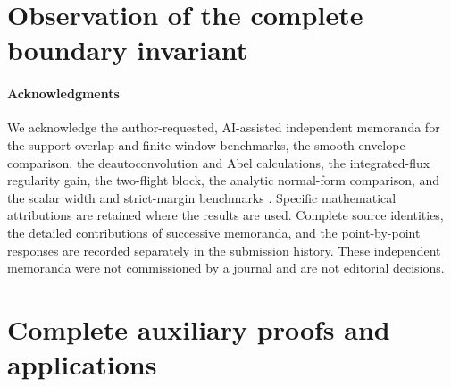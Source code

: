 \part{Observation of the complete boundary invariant}



\subsection*{Acknowledgments}
We acknowledge the author-requested, AI-assisted independent memoranda
for the support-overlap and finite-window benchmarks, the smooth-envelope
comparison, the deautoconvolution and Abel calculations, the integrated-flux
regularity gain, the two-flight block, the analytic normal-form comparison,
and the scalar width and strict-margin benchmarks
\cite{A2ReviewV8,A2ReviewV9,A2ReviewV10,A2ReviewV11,A2ReviewV12,
A2ReviewV13NF,A2ReviewV14,A2ReviewV15}.
Specific mathematical attributions are retained where the results are
used. Complete source identities, the detailed contributions of successive
memoranda, and the point-by-point responses are recorded separately in
the submission history. These independent memoranda were not commissioned
by a journal and are not editorial decisions.

\appendix
\renewcommand{\thesection}{A.\arabic{section}}
\renewcommand{\theHsection}{appendix.\arabic{section}}
\part{Complete auxiliary proofs and applications}





































